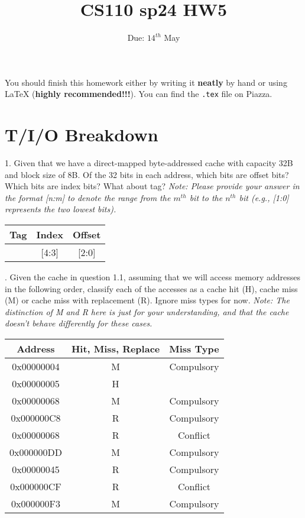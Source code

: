 \documentclass{article}
\title{CS110 sp24 HW5}
\date{Due: $14^{th}$ May}
\begin{document}
\maketitle

You should finish this homework either by writing it \textbf{neatly} by hand or using LaTeX (\textbf{highly recommended!!!}). You can find the \texttt{.tex} file on Piazza.
\section{T/I/O Breakdown}
1. Given that we have a direct-mapped byte-addressed cache with capacity 32B and block size of 8B. Of the 32 bits in each address, which bits are offset bits? Which bits are index bits? What about tag? \textit{Note: Please provide your answer in the format [n:m] to denote the range from the $m^{th}$ bit to the $n^{th}$ bit (e.g., [1:0] represents the two lowest bits).}
\begin{table}[H]
    \centering
    \ttfamily
    \Large
    \setlength{\tabcolsep}{12pt}
    \begin{tabular}{|c|c|c|}
        \hline
        Tag & Index & Offset \\
        \hline
        [31:5] & [4:3] & [2:0]\\ \hline
    \end{tabular}
\end{table}

. Given the cache in question 1.1, assuming that we will access memory addresses in the following order, classify each of the accesses as a cache hit (H), cache miss (M) or cache miss with replacement (R). Ignore miss types for now.
\textit{Note: The distinction of M and R here is just for your understanding, and that the cache doesn't behave differently for these cases.}
\begin{table}[H]
    \centering
    \ttfamily
    \begin{tabular}{|c|c|c|}
        \hline
        Address & Hit, Miss, Replace & Miss Type \\ \hline
        0x00000004 & M& Compulsory\\ \hline
        0x00000005 & H& \\ \hline
        0x00000068 & M& Compulsory\\ \hline
        0x000000C8 & R& Compulsory\\ \hline
        0x00000068 & R& Conflict\\ \hline
        0x000000DD & M& Compulsory\\ \hline
        0x00000045 & R& Compulsory\\ \hline
        0x000000CF & R& Conflict\\ \hline
        0x000000F3 & M& Compulsory\\ \hline
    \end{tabular}
\end{table}
\end{document}
